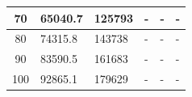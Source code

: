\begin{table}[H]
\begin{tabular}{|c|l|l|l|l|l|}
70                                                                         & 65040.7                              & 125793                                & -                                     & -                                     & -                                     \\ \hline
80                                                                         & 74315.8                              & 143738                                & -                                     & -                                     & -                                     \\ \hline
90                                                                         & 83590.5                              & 161683                                & -                                     & -                                     & -                                     \\ \hline
100                                                                        & 92865.1                              & 179629                                & -                                     & -                                     & -                                     \\ \hline
\end{tabular}
\end{table}


